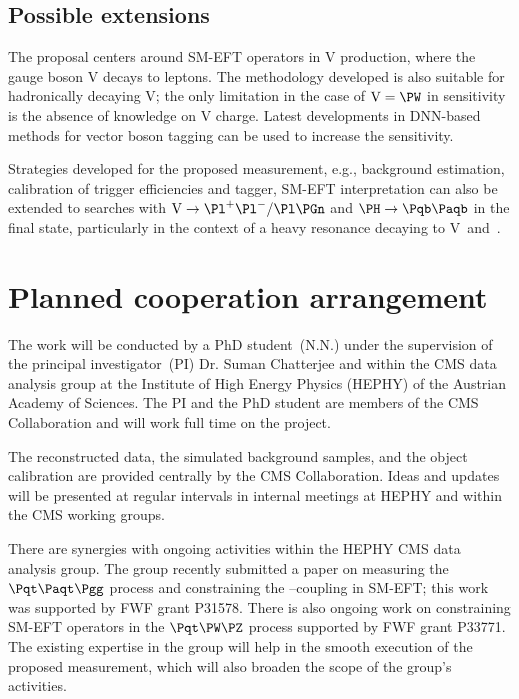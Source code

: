 \documentclass[a4paper,11pt]{article}
\newcommand{\Pb}{{{\Pqb}}\xspace}
\newcommand{\Pt}{{{\Pqt}}\xspace}
\newcommand{\PAb}{{{{\Paqb}}}\xspace}
\newcommand{\PAt}{{{{\Paqt}}}\xspace}
\renewcommand{\PV}{{{{V}}}\xspace}
\newcommand{\VH}{{{\PV}{\PH}}\xspace}
\begin{document}
\subsection{Possible extensions}

The proposal centers around SM-EFT operators in \VH production, where the gauge boson \PV decays to leptons. 
The methodology developed is also suitable for hadronically decaying \PV; 
the only limitation in the case of $\textrm{\PV}={\PW}$ in sensitivity is the absence of knowledge on \PV charge. 
Latest developments in DNN-based methods for vector boson tagging can be used to increase the sensitivity. 

Strategies developed for the proposed measurement, e.g., background estimation, calibration of trigger efficiencies and \PH tagger, SM-EFT interpretation can also be extended to searches with $\textrm{\PV}\rightarrow \Pl^{+}\Pl^{-} / \Pl \Pgn$ and $\PH \to \Pb \PAb$ in the final state, particularly in the context of a heavy resonance decaying to \PV~and~{\PH}. %

\section{Planned cooperation arrangement} 

The work will be conducted by a PhD student~(N.N.) under the supervision of the principal investigator~(PI) Dr. Suman Chatterjee and within the  CMS data analysis group at the Institute of High Energy Physics (HEPHY) of the Austrian Academy of Sciences. The PI and the PhD student are members of the CMS Collaboration and will work full time on the project. 

The reconstructed data, the simulated background samples, and the object calibration are provided centrally by the CMS Collaboration. 
Ideas and updates will be presented at regular intervals in internal meetings at HEPHY and within the CMS working groups. 

There are synergies with ongoing activities within the HEPHY CMS data analysis group.
The group recently submitted a paper on measuring the $\Pt\PAt\Pgg$ process and constraining the \Pt--\Pgg coupling in SM-EFT; this work was supported by FWF grant P31578.
There is also ongoing work on constraining SM-EFT operators in the $\Pt\PW\PZ$ process supported by FWF grant P33771. 
The existing expertise in the group will help in the smooth execution of the proposed measurement, which will also broaden the scope of the group's activities.
\end{document}
